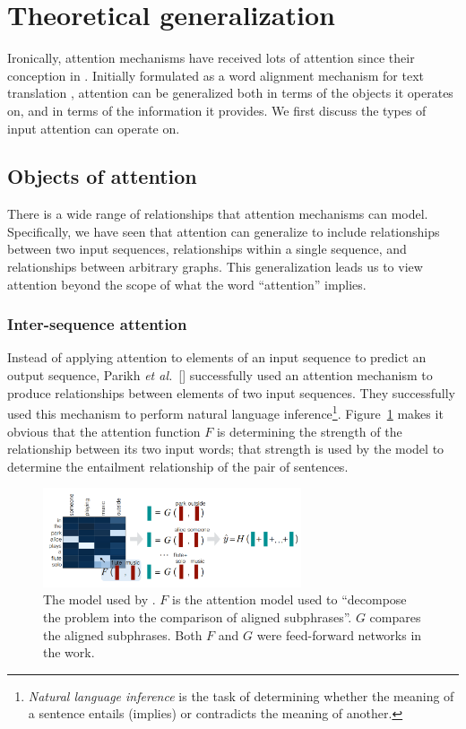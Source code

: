 \documentclass{article}
\newcommand{\etal}{\textit{et al.}}
\begin{document}
\section{Theoretical generalization}

Ironically, attention mechanisms have received lots of attention since their conception in \citeyear{joint_align_translate}. Initially formulated as a word alignment mechanism for text translation \cite{joint_align_translate}, attention can be generalized both in terms of the objects it operates on, and in terms of the information it provides. We first discuss the types of input attention can operate on.

\subsection{Objects of attention}

There is a wide range of relationships that attention mechanisms can model. Specifically, we have seen that attention can generalize to include relationships between two input sequences, relationships within a single sequence, and relationships between arbitrary graphs. This generalization leads us to view attention beyond the scope of what the word ``attention'' implies.

\subsubsection{Inter-sequence attention}

Instead of applying attention to elements of an input sequence to predict an output sequence, Parikh \etal~[\citeyear{natural_language_inference}] successfully used an attention mechanism to produce relationships between elements of two input sequences. They successfully used this mechanism to perform natural language inference\footnote{\textit{Natural language inference} is the task of determining whether the meaning of a sentence entails (implies) or contradicts the meaning of another.}. Figure~\ref{figure:inference} makes it obvious that the attention function $F$ is determining the strength of the relationship between its two input words; that strength is used by the model to determine the entailment relationship of the pair of sentences.

\begin{figure}
    \centering
    \includegraphics[width=3in]{figures/inference.png}
    \caption{The model used by \protect\cite{natural_language_inference}. $F$ is the attention model used to ``decompose the problem into the comparison of aligned subphrases''. $G$ compares the aligned subphrases. Both $F$ and $G$ were feed-forward networks in the work.}\label{figure:inference}
\end{figure}
\end{document}
